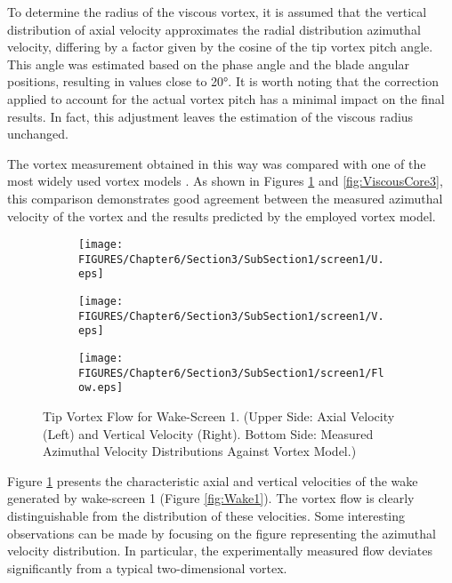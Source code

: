 To determine the radius of the viscous vortex, it is assumed that the vertical distribution of axial velocity approximates the radial distribution azimuthal velocity, differing by a factor given by the cosine of the tip vortex pitch angle. This angle was estimated based on the phase angle and the blade angular positions, resulting in values close to 20°.
It is worth noting that the correction applied to account for the actual vortex pitch has a minimal impact on the final results. In fact, this adjustment leaves the estimation of the viscous radius unchanged.

The vortex measurement obtained in this way was compared with one of the most widely used vortex models \cite{Proctor2010}. As shown in Figures \ref{fig:ViscousCore1} and \ref{fig:ViscousCore3}, this comparison demonstrates good agreement between the measured azimuthal velocity of the vortex and the results predicted by the employed vortex model.

\begin{figure}[htbp]
    \centering
    \begin{subfigure}[b]{0.48\textwidth}
        \centering
        \texttt{[image: FIGURES/Chapter6/Section3/SubSection1/screen1/U.eps]}
    \end{subfigure}
    \hfill
    \begin{subfigure}[b]{0.48\textwidth}
        \centering
        \texttt{[image: FIGURES/Chapter6/Section3/SubSection1/screen1/V.eps]}
    \end{subfigure}
    
    \vspace{1cm} 
    
    \begin{subfigure}[b]{0.75\textwidth}
        \centering
        \texttt{[image: FIGURES/Chapter6/Section3/SubSection1/screen1/Flow.eps]}
    \end{subfigure}
    \caption{Tip Vortex Flow for Wake-Screen 1. (Upper Side: Axial Velocity (Left) and Vertical Velocity (Right). Bottom Side: Measured Azimuthal Velocity Distributions Against Vortex Model.)}
    \label{fig:ViscousCore1}
\end{figure}

Figure \ref{fig:ViscousCore1} presents the characteristic axial and vertical velocities of the wake generated by wake-screen 1 (Figure \ref{fig:Wake1}). The vortex flow is clearly distinguishable from the distribution of these velocities. Some interesting observations can be made by focusing on the figure representing the azimuthal velocity distribution.
In particular, the experimentally measured flow deviates significantly from a typical two-dimensional vortex.

